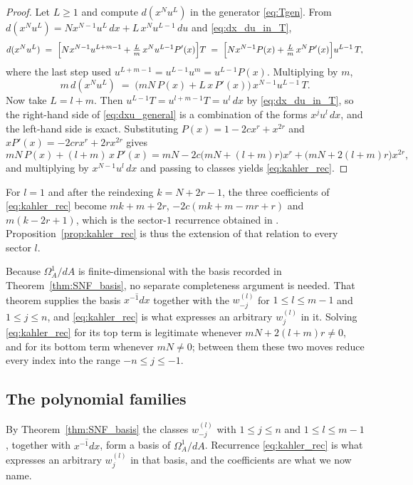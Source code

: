 \documentclass[11pt]{amsart}
\theoremstyle{definition}
\theoremstyle{remark}
\newcommand{\ol}[1]{\overline{#1}}
\begin{document}
\begin{proof}
Let $L\geq1$ and compute $d(x^Nu^L)$ in the generator \eqref{eq:Tgen}. From
$d(x^Nu^L)=Nx^{N-1}u^L\,dx+L\,x^Nu^{L-1}\,du$ and
\eqref{eq:dx_du_in_T},
\[
  d(x^Nu^L)
  \;=\; \Bigl[N x^{N-1}u^{L+m-1} + \tfrac{L}{m}\,x^{N}u^{L-1}P'(x)\Bigr]T
  \;=\; \Bigl[N x^{N-1}P(x) + \tfrac{L}{m}\,x^{N}P'(x)\Bigr]u^{L-1}\,T ,
\]
where the last step used $u^{L+m-1}=u^{L-1}u^{m}=u^{L-1}P(x)$. Multiplying by
$m$,
\begin{equation}\label{eq:dxu_general}
  m\,d(x^Nu^L)
  \;=\; \bigl(mN\,P(x) + L\,x\,P'(x)\bigr)\,x^{N-1}u^{L-1}\,T .
\end{equation}
Now take $L=l+m$. Then $u^{L-1}T=u^{l+m-1}T=u^{l}\,dx$ by
\eqref{eq:dx_du_in_T}, so the right-hand side of \eqref{eq:dxu_general} is
a combination of the forms $x^{j}u^{l}\,dx$, and the left-hand side is exact.
Substituting $P(x)=1-2cx^r+x^{2r}$ and $xP'(x)=-2crx^{r}+2rx^{2r}$ gives
\[
  mN\,P(x)+(l+m)\,x\,P'(x)
  = mN - 2c\bigl(mN+(l+m)r\bigr)x^{r} + \bigl(mN+2(l+m)r\bigr)x^{2r},
\]
and multiplying by $x^{N-1}u^{l}\,dx$ and passing to classes yields
\eqref{eq:kahler_rec}.
\end{proof}


For $l=1$ and after the reindexing $k=N+2r-1$, the three coefficients of
\eqref{eq:kahler_rec} become $mk+m+2r$, $-2c(mk+m-mr+r)$ and $m(k-2r+1)$,
which is the sector-$1$ recurrence obtained in
\cite{SantosNeklyudovFutorny2025}. Proposition~\ref{prop:kahler_rec} is thus
the extension of that relation to every sector $l$.

Because $\Omega^1_A/dA$ is finite-dimensional with the basis recorded in
Theorem~\ref{thm:SNF_basis}, no separate completeness argument is needed. That
theorem supplies the basis $\ol{x^{-1}dx}$ together with the $w^{(l)}_{-j}$ for
$1\leq l\leq m-1$ and $1\leq j\leq n$, and \eqref{eq:kahler_rec} is what
expresses an arbitrary $w^{(l)}_j$ in it. Solving \eqref{eq:kahler_rec} for its
top term is legitimate whenever $mN+2(l+m)r\neq0$, and for its bottom term
whenever $mN\neq0$; between them these two moves reduce every index into the
range $-n\leq j\leq-1$.

\subsection{The polynomial families}

By Theorem~\ref{thm:SNF_basis} the classes $w^{(l)}_{-j}$ with $1\leq j\leq n$
and $1\leq l\leq m-1$, together with $\ol{x^{-1}dx}$, form a basis of
$\Omega^1_A/dA$. Recurrence \eqref{eq:kahler_rec} is what expresses an
arbitrary $w^{(l)}_j$ in that basis, and the coefficients are what we now name.
\end{document}
